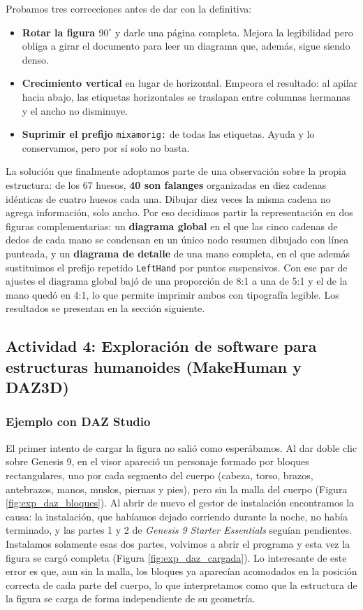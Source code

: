 Probamos tres correcciones antes de dar con la definitiva:
\begin{itemize}[noitemsep, topsep=4pt]
    \item \textbf{Rotar la figura $90^\circ$} y darle una página completa. Mejora la legibilidad pero obliga a girar el documento para leer un diagrama que, además, sigue siendo denso.
    \item \textbf{Crecimiento vertical} en lugar de horizontal. Empeora el resultado: al apilar hacia abajo, las etiquetas horizontales se traslapan entre columnas hermanas y el ancho no disminuye.
    \item \textbf{Suprimir el prefijo} \texttt{mixamorig:} de todas las etiquetas. Ayuda y lo conservamos, pero por sí solo no basta.
\end{itemize}

La solución que finalmente adoptamos parte de una observación sobre la propia estructura: de los 67 huesos, \textbf{40 son falanges} organizadas en diez cadenas idénticas de cuatro huesos cada una. Dibujar diez veces la misma cadena no agrega información, solo ancho. Por eso decidimos partir la representación en dos figuras complementarias: un \textbf{diagrama global} en el que las cinco cadenas de dedos de cada mano se condensan en un único nodo resumen dibujado con línea punteada, y un \textbf{diagrama de detalle} de una mano completa, en el que además sustituimos el prefijo repetido \texttt{LeftHand} por puntos suspensivos. Con ese par de ajustes el diagrama global bajó de una proporción de 8:1 a una de 5:1 y el de la mano quedó en 4:1, lo que permite imprimir ambos con tipografía legible. Los resultados se presentan en la sección siguiente.

\subsection{Actividad 4: Exploración de software para estructuras humanoides (MakeHuman y DAZ3D)}
\subsubsection{Ejemplo con DAZ Studio}

El primer intento de cargar la figura no salió como esperábamos. Al dar doble clic sobre Genesis 9, en el visor apareció un personaje formado por bloques rectangulares, uno por cada segmento del cuerpo (cabeza, torso, brazos, antebrazos, manos, muslos, piernas y pies), pero sin la malla del cuerpo (Figura \ref{fig:exp_daz_bloques}). Al abrir de nuevo el gestor de instalación encontramos la causa: la instalación, que habíamos dejado corriendo durante la noche, no había terminado, y las partes 1 y 2 de \textit{Genesis 9 Starter Essentials} seguían pendientes. Instalamos solamente esas dos partes, volvimos a abrir el programa y esta vez la figura se cargó completa (Figura \ref{fig:exp_daz_cargada}). Lo interesante de este error es que, aun sin la malla, los bloques ya aparecían acomodados en la posición correcta de cada parte del cuerpo, lo que interpretamos como que la estructura de la figura se carga de forma independiente de su geometría.

